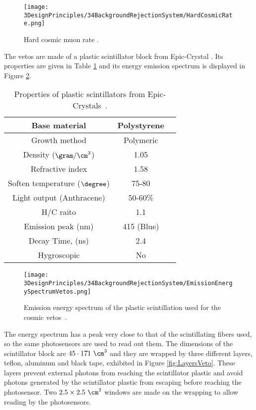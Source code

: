 \begin{figure}[h]
\centering
\texttt{[image: 3DesignPrinciples/34BackgroundRejectionSystem/HardCosmicRate.png]}
\caption{Hard cosmic muon rate \cite{HardCosmicMuonRatePlot}.\label{fig:HardCoscmicRate}}
\end{figure}

The vetos are made of a plastic scintillator block from Epic-Crystal \cite{ScintillatorVeto}. Its properties are given in Table \ref{tab:ParametersScintillatorVeto} and its energy emission spectrum is displayed in Figure \ref{fig:EmissionEnergySpectrumVeto}.

\begin{table}[]
\begin{center}
\begin{tabular}{|c|c|c|}
\hline \hline 
Base material & Polystyrene \\ \hline
Growth method & Polymeric \\ \hline
Density ($\gram/\cm^3$)& 1.05 \\ \hline
Refractive index & 1.58 \\ \hline
Soften temperature ($\degree$) & 75-80 \\ \hline
Light output (Anthracene) & 50-60\% \\ \hline
H/C raito & 1.1 \\ \hline
Emission peak (nm) & 415 (Blue) \\ \hline
Decay Time, (ns) & 2.4 \\ \hline
Hygroscopic & No \\ \hline
\end{tabular}
\caption{Properties of plastic scintillators from Epic-Crystals~\cite{ScintillatorVeto}.}
\label{tab:ParametersScintillatorVeto}
\end{center}
\end{table}

\begin{figure}[]
\centering
\texttt{[image: 3DesignPrinciples/34BackgroundRejectionSystem/EmissionEnergySpectrumVetos.png]}
\caption{Emission energy spectrum of the plastic scintillation used for the cosmic vetos\label{fig:EmissionEnergySpectrumVeto}~\cite{ScintillatorVeto}.}
\end{figure}

The energy spectrum has a peak very close to that of the scintillating fibers used, so the same photosensors are used to read out them. The dimensions of the scintillator block are $45 \cdot{} 17 \dot{} 1~\cm^3$ and they are wrapped by three different layers, teflon, aluminum and black tape, exhibited in Figure \ref{fig:LayersVeto}. These layers prevent external photons from reaching the scintillator plastic and avoid photons generated by the scintillator plastic from escaping before reaching the photosensor. Two $2.5\times 2.5 ~\cm^2$ windows are made on the wrapping to allow reading by the photosensors.



